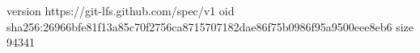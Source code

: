 version https://git-lfs.github.com/spec/v1
oid sha256:26966bfe81f13a85c70f2756ca8715707182dae86f75b0986f95a9500eee8eb6
size 94341
